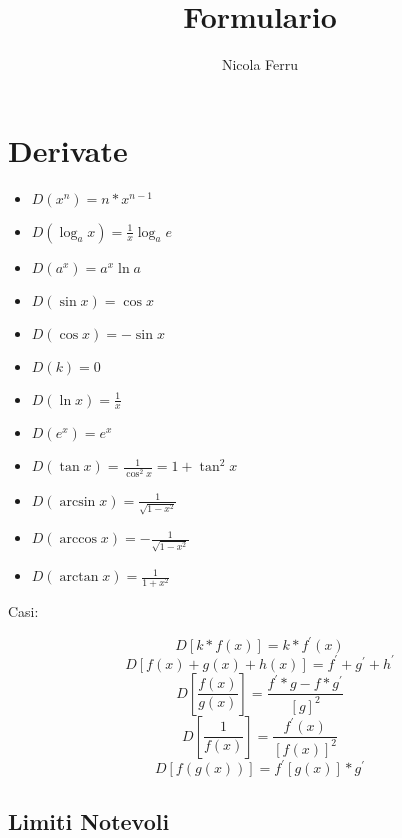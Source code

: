 \documentclass{article}
\title{Formulario}
\author{Nicola Ferru}
\begin{document}
\maketitle
\section{Derivate}
\begin{multicols}{2}
	\begin{itemize}
		\item $D(x^n)=n*x^{n-1}$
		\item $D(\log_ax)=\frac{1}{x}\log_a e$
		\item $D(a^x)=a^x\ln a$
		\item $D(\sin x)=\cos x$
		\item $D(\cos x)=-\sin x$
		\item $D(k)=0$
		\item $D(\ln x)=\frac{1}{x}$
		\item $D(e^x)=e^x$
		\item $D(\tan x)=\frac{1}{\cos^2 x}=1+\tan^2x$
		\item $D(\arcsin x)=\frac{1}{\sqrt{1-x^2}}$
		\item $D(\arccos x)=-\frac{1}{\sqrt{1-x^2}}$
		\item $D(\arctan x)=\frac{1}{1+x^2}$
	\end{itemize}
\end{multicols}
Casi:
\begin{multicols}{2}
	\begin{equation}
		D[k*f(x)]=k*f^\prime(x)
	\end{equation}
	\begin{equation}
		D[f(x)+g(x)+h(x)]=f^\prime+g^\prime+h^\prime
	\end{equation}
	\begin{equation}
		D\left[\frac{f(x)}{g(x)}\right]=\frac{f^\prime*g-f*g^\prime}{\left[ g\right]^2}
	\end{equation}
	\begin{equation}
		D\left[\frac{1}{f(x)}\right]=\frac{f^\prime(x)}{\left[f(x)\right]^2}
	\end{equation}
	\begin{equation}
		D[f(g(x))]=	f^\prime[g(x)]*g^\prime
	\end{equation}
\end{multicols}
\subsection{Limiti Notevoli}
\end{document}
